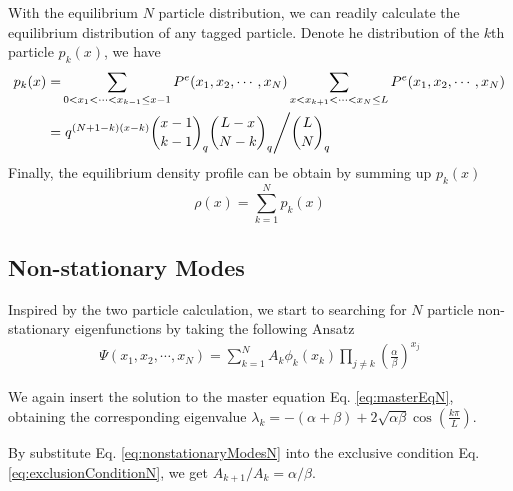 \documentclass[12pt,a4paper]{article}
\begin{document}
With the equilibrium $N$ particle distribution, we can readily calculate the
equilibrium distribution of any tagged particle. Denote he distribution of the
$k$th particle $p_k(x)$, we have
\begin{equation}
    \begin{aligned}
        \label{eq:pdfTaggedParticle}
        p_k(x) = & \sum_{0<x_1<\cdots<x_{k-1}\le x-1}P^e(x_1, x_2, \cdots, x_N)
        \sum_{x<x_{k+1}<\cdots<x_{N}\le L}P^e(x_1, x_2, \cdots, x_N) \\
        = & \left. q^{(N+1-k)(x-k)} \binom{x-1}{k-1}_q\binom{L-x}{N-k}_q 
            \middle/  \binom{L}{N}_q \right.
    \end{aligned}
\end{equation}
Finally, the equilibrium density profile can be obtain by summing up $p_k(x)$
\begin{equation}
    \label{eq:densityProfile}
    \rho(x) = \sum_{k=1}^N p_k(x) 
\end{equation}


\subsection{Non-stationary Modes}
\label{sub:non_stationary_modes}

Inspired by the two particle calculation, we start to searching for $N$
particle non-stationary eigenfunctions by taking the following Ansatz
\begin{equation}
    \label{eq:nonstationaryModesN}
    \begin{aligned}
        \Psi(x_1, x_2, \cdots, x_N) = \sum_{k=1}^N
         A_{k}\phi_k(x_k)\prod_{j\neq k} 
         \left(\frac{\alpha}{\beta}\right)^{x_j}
    \end{aligned}
\end{equation}

We again insert the solution to the master equation Eq. \eqref{eq:masterEqN},
obtaining the corresponding eigenvalue $\lambda_k = -(\alpha+\beta) + 
2\sqrt{\alpha\beta}\cos(\frac{k\pi}{L})$.

By substitute Eq. \eqref{eq:nonstationaryModesN} into the exclusive condition
Eq. \eqref{eq:exclusionConditionN}, we get $A_{k+1} / A_{k} =  \alpha /
\beta$.
\end{document}
